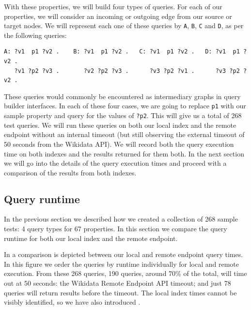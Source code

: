 With these properties, we will build four types of queries. For each of our properties, we will consider an incoming or outgoing edge from our source or target nodes. We will represent each one of these queries by \texttt{A}, \texttt{B}, \texttt{C} and \texttt{D}, as per the following queries: 

\begin{verbatim}
A: ?v1  p1 ?v2 .    B: ?v1  p1 ?v2 .   C: ?v1  p1 ?v2 .   D: ?v1  p1 ?v2 .
   ?v1 ?p2 ?v3 .       ?v2 ?p2 ?v3 .      ?v3 ?p2 ?v1 .      ?v3 ?p2 ?v2 .
\end{verbatim}

These queries would commonly be encountered as intermediary graphs in query builder interfaces. In each of these four cases, we are going to replace \texttt{p1} with our sample property and query for the values of \texttt{?p2}. This will give us a total of 268 test queries. We will run these queries on both our local index and the remote endpoint without an internal timeout (but still observing the external timeout of 50 seconds from the Wikidata API). We will record both the query execution time on both indexes and the results returned for them both. In the next section we will go into the details of the query execution times and proceed with a comparison of the results from both indexes.

\subsection{Query runtime}

In the previous section we described how we created a collection of 268 sample tests: 4 query types for 67 properties. In this section we compare the query runtime for both our local index and the remote endpoint.

In  a comparison is depicted between our local and remote endpoint query times. In this figure we order the queries by runtime individually for local and remote execution. From these 268 queries, 190 queries, around 70\% of the total, will time out at 50 seconds: the Wikidata Remote Endpoint API timeout; and just 78 queries will return results before the timeout. The local index times cannot be visibly identified, so we have also introduced .

